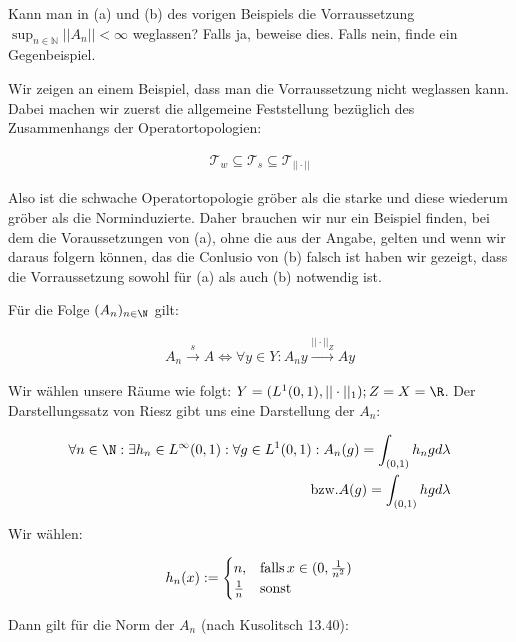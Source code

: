 \begin{exercise}
Kann man in (a) und (b) des vorigen Beispiels die Vorraussetzung
$\sup_{n \in \mathbb{N}} ||A_n|| < \infty$ weglassen?
Falls ja, beweise dies. Falls nein, finde ein Gegenbeispiel.
\end{exercise}
\begin{solution}

Wir zeigen an einem Beispiel, dass man die Vorraussetzung nicht weglassen kann.
Dabei machen wir zuerst die allgemeine Feststellung bezüglich des Zusammenhangs der
Operatortopologien:

\begin{align*}
  \mathcal{T}_w \subseteq \mathcal{T}_s \subseteq \mathcal{T}_{||\cdot||}
\end{align*}

Also ist die schwache Operatortopologie gröber als die starke und diese wiederum
gröber als die Norminduzierte. Daher brauchen wir nur ein Beispiel finden, bei dem
die Voraussetzungen von (a), ohne die aus der Angabe, gelten und wenn wir daraus folgern können, das die Conlusio von (b) falsch ist haben wir gezeigt, dass die Vorraussetzung sowohl
für (a) als auch (b) notwendig ist.

Für die Folge $(A_n)_{n \in \N}$ gilt:

\begin{align*}
  A_n \stackrel{s}{\rightarrow} A
  \Leftrightarrow
  \forall y \in Y: A_n y \stackrel{||\cdot||_Z}{\rightarrow} Ay
\end{align*}

Wir wählen unsere Räume wie folgt: $Y = (L^1 (0,1), ||\cdot||_1) ; Z=X=\R$. Der
Darstellungssatz von Riesz gibt uns eine Darstellung der $A_n$:

\begin{align*}
  \forall n \in \N: \exists h_n \in L^{\infty}(0,1):
  \forall g \in L^1 (0,1): A_n(g) = \int_{(0,1)}h_n g d\lambda \\
  \text{bzw.} A(g)= \int_{(0,1)} hg d\lambda
\end{align*}

Wir wählen:

\begin{align*}
  h_n (x):= \begin{cases}
    n, & \text{falls\,} x \in (0,\frac{1}{n^2}) \\
    \frac{1}{n} & \text{sonst}
  \end{cases}
\end{align*}

Dann gilt für die Norm der $A_n$ (nach Kusolitsch 13.40):


\end{solution}
